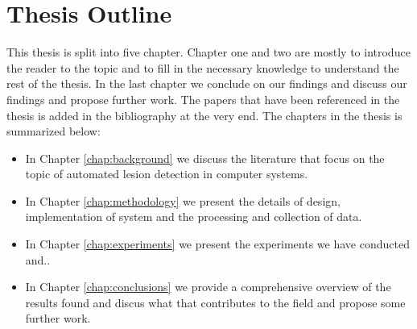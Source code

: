 \documentclass[thesis.tex]{subfiles}
\begin{document}
\section{Thesis Outline} \label{sec:thesis_outline}
This thesis is split into five chapter. Chapter one and two are mostly to introduce the reader to the topic and to fill in the necessary knowledge to understand the rest of the thesis. In the last chapter we conclude on our findings and discuss our findings and propose further work. The papers that have been referenced in the thesis is added in the bibliography at the very end. The chapters in the thesis is summarized below:

\begin{itemize}
\item In Chapter \ref{chap:background} we discuss the literature that focus on the topic of automated lesion detection in computer systems.

\item In Chapter \ref{chap:methodology} we present the details of design, implementation of system and the processing and collection of data.

\item In Chapter \ref{chap:experiments} we present the experiments we have conducted and..

\item In Chapter \ref{chap:conclusions} we provide a comprehensive overview of the results found and discus what that contributes to the field and propose some further work.

\end{itemize}
\end{document}
